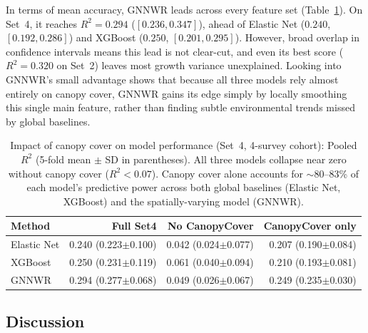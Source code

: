 \documentclass[logo,msc,ai]{infthesis}           %
\begin{document}
In terms of mean accuracy, GNNWR leads across every feature set (Table~\ref{tab:results-q2-ablation}). On Set~4, it reaches $R^2 = 0.294$ ($[0.236, 0.347]$), ahead of Elastic Net ($0.240$, $[0.192, 0.286]$) and XGBoost ($0.250$, $[0.201, 0.295]$). However, broad overlap in confidence intervals means this lead is not clear-cut, and even its best score ($R^2 = 0.320$ on Set~2) leaves most growth variance unexplained. Looking into GNNWR's small advantage shows that because all three models rely almost entirely on canopy cover, GNNWR gains its edge simply by locally smoothing this single main feature, rather than finding subtle environmental trends missed by global baselines.

\begin{table}[h]
\centering
\footnotesize
\renewcommand{\arraystretch}{1.2}
\begin{tabular*}{\textwidth}{@{\extracolsep{\fill}}lrrr@{}}
\toprule
Method & Full Set4 & No CanopyCover & CanopyCover only \\
\midrule
Elastic Net & 0.240 (0.223$\pm$0.100) & 0.042 (0.024$\pm$0.077) & 0.207 (0.190$\pm$0.084) \\
XGBoost & 0.250 (0.231$\pm$0.119) & 0.061 (0.040$\pm$0.094) & 0.210 (0.193$\pm$0.081) \\
GNNWR & 0.294 (0.277$\pm$0.068) & 0.049 (0.026$\pm$0.067) & 0.249 (0.235$\pm$0.030) \\
\bottomrule
\end{tabular*}
\caption{\small{Impact of canopy cover on model performance (Set~4, 4-survey cohort): Pooled $R^2$ (5-fold mean $\pm$ SD in parentheses). All three models collapse near zero without canopy cover ($R^2 < 0.07$). Canopy cover alone accounts for $\sim$80--83\% of each model's predictive power across both global baselines (Elastic Net, XGBoost) and the spatially-varying model (GNNWR).}}
\label{tab:results-q2-ablation}
\end{table}

\subsection{Discussion}
\end{document}
